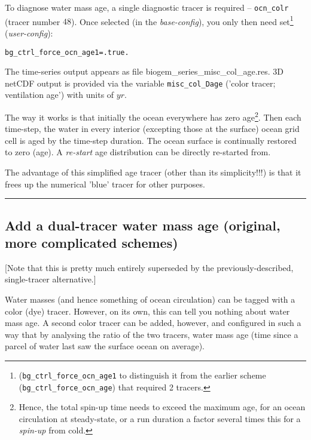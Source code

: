 To diagnose water mass age, a single diagnostic tracer is required -- \texttt{ocn\_colr} (tracer number \(48\)). Once selected (in the \textit{base-config}), you only then need set\footnote{(\texttt{bg\_ctrl\_force\_ocn\_age1} to distinguish it from the earlier scheme (\texttt{bg\_ctrl\_force\_ocn\_age}) that required 2 tracers.} (\textit{user-config}):
\vspace{-1mm}\small\begin{verbatim}
bg_ctrl_force_ocn_age1=.true.
\end{verbatim}\normalsize\vspace{-1mm}

The time-series output appears as file \textsf{\footnotesize biogem\_series\_misc\_col\_age.res}. 3D netCDF output is provided via the variable \texttt{misc\_col\_Dage} ('color tracer; ventilation age') with units of \(yr\).

The way it works is that initially the ocean everywhere has zero age\footnote{Hence, the total spin-up time needs to exceed the maximum age, for an ocean circulation at steady-state, or a run duration a factor several times this for a \textit{spin-up} from cold.}. Then each time-step, the water in every interior (excepting those at the surface) ocean grid cell is aged by the time-step duration. The ocean surface is continually restored to zero (age). A \textit{re-start} age distribution can be directly re-started from.

The advantage of this simplified age tracer (other than its simplicity!!!) is that it frees up the numerical 'blue' tracer for other purposes.

\noindent\rule{4cm}{0.5pt}

%
\newpage
\subsection*{Add a dual-tracer water mass age  (original, more complicated schemes)}
\vspace{2mm}

[Note that this is pretty much entirely superseded by the previously-described, single-tracer alternative.]

\vspace{1mm}
\noindent Water masses (and hence something of ocean circulation) can be tagged with a color (dye) tracer. However, on its own, this can tell you nothing about water mass age. A second color tracer can be added, however, and configured in such a way that by analysing the ratio of the two tracers, water mass age (time since a parcel of water last saw the surface ocean on average).

